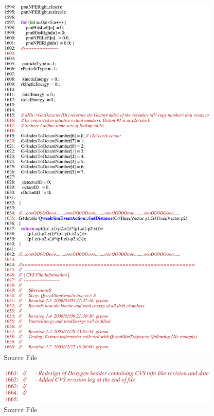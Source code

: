 \clearpage

\begin{figure}[h]
  \hspace{0cm}
  \includegraphics[scale=0.8]{./figures13/QweakSimEventAction.cc-p28.eps}
  \caption{Source File}
           \label{fig:XIII-SC-43}
\end{figure}

\clearpage

\begin{figure}[h]
  \hspace{0cm}
  \includegraphics[scale=0.8]{./figures13/QweakSimEventAction.cc-p29.eps}
  \caption{Source File}
           \label{fig:XIII-SC-44}
\end{figure}


